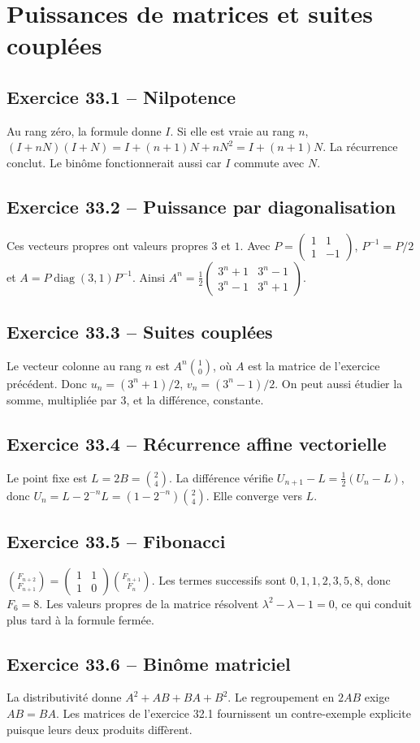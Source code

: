 \chapter{Puissances de matrices et suites couplées}
\section*{Exercice 33.1 -- Nilpotence}
Au rang zéro, la formule donne $I$. Si elle est vraie au rang $n$, $(I+nN)(I+N)=I+(n+1)N+nN^2=I+(n+1)N$. La récurrence conclut. Le binôme fonctionnerait aussi car $I$ commute avec $N$.

\section*{Exercice 33.2 -- Puissance par diagonalisation}
Ces vecteurs propres ont valeurs propres $3$ et $1$. Avec $P=\begin{pmatrix}1&1\\1&-1\end{pmatrix}$, $P^{-1}=P/2$ et $A=P\operatorname{diag}(3,1)P^{-1}$. Ainsi $A^n=\frac12\begin{pmatrix}3^n+1&3^n-1\\3^n-1&3^n+1\end{pmatrix}$.

\section*{Exercice 33.3 -- Suites couplées}
Le vecteur colonne au rang $n$ est $A^n\binom10$, où $A$ est la matrice de l'exercice précédent. Donc $u_n=(3^n+1)/2$, $v_n=(3^n-1)/2$. On peut aussi étudier la somme, multipliée par $3$, et la différence, constante.

\section*{Exercice 33.4 -- Récurrence affine vectorielle}
Le point fixe est $L=2B=\binom24$. La différence vérifie $U_{n+1}-L=\frac12(U_n-L)$, donc $U_n=L-2^{-n}L=(1-2^{-n})\binom24$. Elle converge vers $L$.

\section*{Exercice 33.5 -- Fibonacci}
$\binom{F_{n+2}}{F_{n+1}}=\begin{pmatrix}1&1\\1&0\end{pmatrix}\binom{F_{n+1}}{F_n}$. Les termes successifs sont $0,1,1,2,3,5,8$, donc $F_6=8$. Les valeurs propres de la matrice résolvent $\lambda^2-\lambda-1=0$, ce qui conduit plus tard à la formule fermée.

\section*{Exercice 33.6 -- Binôme matriciel}
La distributivité donne $A^2+AB+BA+B^2$. Le regroupement en $2AB$ exige $AB=BA$. Les matrices de l'exercice 32.1 fournissent un contre-exemple explicite puisque leurs deux produits diffèrent.
